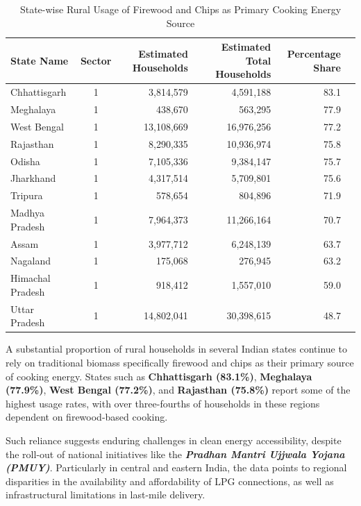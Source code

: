 \documentclass{article}
\begin{document}
\begin{table}[h!]
	\centering
	\caption{State-wise Rural Usage of Firewood and Chips as Primary Cooking Energy Source}
	
		\begin{tabular}{|l|c|r|r|r|l|}
			\hline
			\textbf{State Name} & \textbf{Sector} & \textbf{Estimated  Households } & \textbf{Estimated Total  Households} & \textbf{Percentage Share} \\
			\hline
			Chhattisgarh        & 1 & 3,814,579   & 4,591,188   & 83.1   \\
			Meghalaya           & 1 &   438,670   &   563,295   & 77.9   \\
			West Bengal         & 1 &13,108,669   &16,976,256   & 77.2   \\
			Rajasthan           & 1 & 8,290,335   &10,936,974   & 75.8   \\
			Odisha              & 1 & 7,105,336   & 9,384,147   & 75.7   \\
			Jharkhand           & 1 & 4,317,514   & 5,709,801   & 75.6   \\
			Tripura             & 1 &   578,654   &   804,896   & 71.9  \\
			Madhya Pradesh      & 1 & 7,964,373   &11,266,164   & 70.7   \\
			Assam               & 1 & 3,977,712   & 6,248,139   & 63.7   \\
			Nagaland            & 1 &   175,068   &   276,945   & 63.2  \\
			Himachal Pradesh    & 1 &   918,412   & 1,557,010   & 59.0   \\
			Uttar Pradesh       & 1 &14,802,041   &30,398,615   & 48.7   \\
			\hline
		\end{tabular}
\end{table}

A substantial proportion of rural households in several Indian states continue to rely on traditional biomass specifically firewood and chips as their primary source of cooking energy. States such as \textbf{Chhattisgarh (83.1\%)}, \textbf{Meghalaya (77.9\%)}, \textbf{West Bengal (77.2\%)}, and \textbf{Rajasthan (75.8\%)} report some of the highest usage rates, with over three-fourths of households in these regions dependent on firewood-based cooking.

Such reliance suggests enduring challenges in clean energy accessibility, despite the roll-out of national initiatives like the \textbf{\textit{Pradhan Mantri Ujjwala Yojana (PMUY)}}. Particularly in central and eastern India, the data points to regional disparities in the availability and affordability of LPG connections, as well as infrastructural limitations in last-mile delivery.
\end{document}
